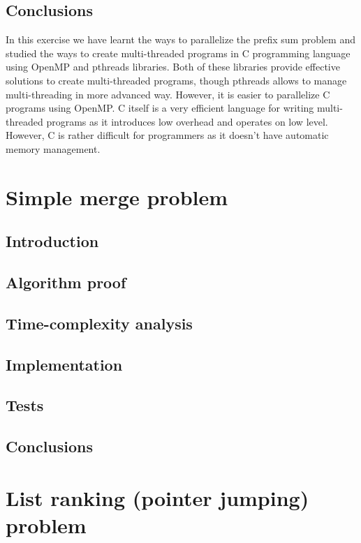 \documentclass[a4paper,10pt,notitlepage]{article}
\begin{document}
\subsection{Conclusions}

In this exercise we have learnt the ways to parallelize the prefix sum problem and studied the ways to create multi-threaded programs in C programming language using OpenMP and pthreads libraries. Both of these libraries provide effective solutions to create multi-threaded programs, though pthreads allows to manage multi-threading in more advanced way. However, it is easier to parallelize C programs using OpenMP. C itself is a very efficient language for writing multi-threaded programs as it introduces low overhead and operates on low level. However, C is rather difficult for programmers as it doesn't have automatic memory management.

\section{Simple merge problem}

\subsection{Introduction}

\subsection{Algorithm proof}

\subsection{Time-complexity analysis}

\subsection{Implementation}

\subsection{Tests}

\subsection{Conclusions}


\section{List ranking (pointer jumping) problem}
\end{document}
